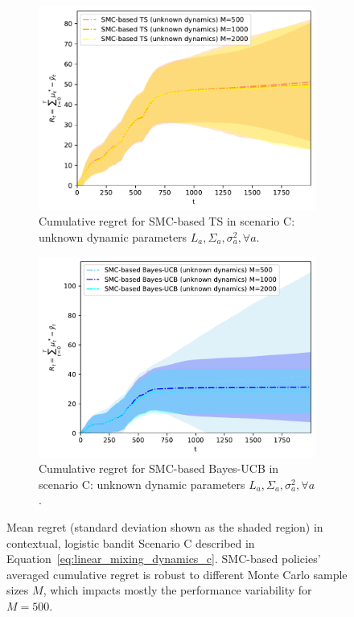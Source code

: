 \begin{figure}[!h]
	\begin{subfigure}[b]{0.45\textwidth}
		\includegraphics[width=\textwidth]{./fods_figs/dynamic/logistic/c_selectedM_cumulative_regret_dunknown_ts}
		\caption{Cumulative regret for SMC-based TS in scenario C: unknown dynamic parameters $L_a,\Sigma_a,\sigma_a^2, \forall a$.}
		\label{fig:dynamic_bandits_logistic_c_ts_dunknown_M}
	\end{subfigure}\qquad
	\begin{subfigure}[b]{0.45\textwidth}
		\includegraphics[width=\textwidth]{./fods_figs/dynamic/logistic/c_selectedM_cumulative_regret_dunknown_bucb}
		\caption{Cumulative regret for SMC-based Bayes-UCB in scenario C: unknown dynamic parameters $L_a,\Sigma_a,\sigma_a^2, \forall a$.}
		\label{fig:dynamic_bandits_logistic_c_bucb_dunknown_M}
	\end{subfigure}
	
	\caption{
		Mean regret (standard deviation shown as the shaded region) in contextual, logistic bandit Scenario C
		described in Equation~\eqref{eq:linear_mixing_dynamics_c}.
		SMC-based policies' averaged cumulative regret is robust to different Monte Carlo sample sizes $M$,
		which impacts mostly the performance variability for $M=500$. 
	}
	\label{fig:dynamic_bandits_logistic_c_M}
\end{figure}

